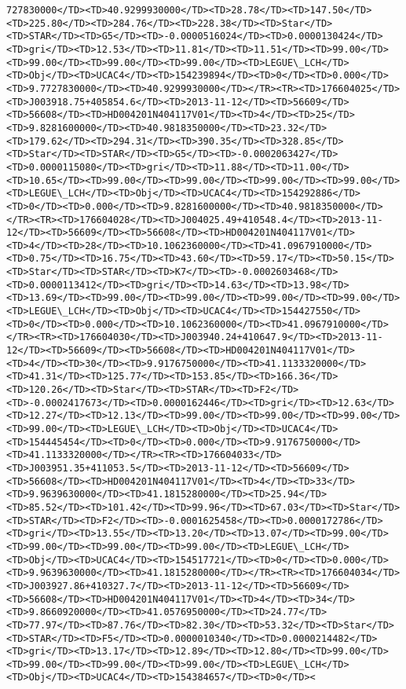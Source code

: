 \documentclass[11pt]{article}
\begin{document}
\begin{Verbatim}[commandchars=\\\{\}]
727830000</TD><TD>40.9299930000</TD><TD>28.78</TD><TD>147.50</TD><TD>225.80</TD><TD>284.76</TD><TD>228.38</TD><TD>Star</TD><TD>STAR</TD><TD>G5</TD><TD>-0.0000516024</TD><TD>0.0000130424</TD><TD>gri</TD><TD>12.53</TD><TD>11.81</TD><TD>11.51</TD><TD>99.00</TD><TD>99.00</TD><TD>99.00</TD><TD>99.00</TD><TD>LEGUE\_LCH</TD><TD>Obj</TD><TD>UCAC4</TD><TD>154239894</TD><TD>0</TD><TD>0.000</TD><TD>9.7727830000</TD><TD>40.9299930000</TD></TR><TR><TD>176604025</TD><TD>J003918.75+405854.6</TD><TD>2013-11-12</TD><TD>56609</TD><TD>56608</TD><TD>HD004201N404117V01</TD><TD>4</TD><TD>25</TD><TD>9.8281600000</TD><TD>40.9818350000</TD><TD>23.32</TD><TD>179.62</TD><TD>294.31</TD><TD>390.35</TD><TD>328.85</TD><TD>Star</TD><TD>STAR</TD><TD>G5</TD><TD>-0.0002063427</TD><TD>0.0000115080</TD><TD>gri</TD><TD>11.88</TD><TD>11.00</TD><TD>10.65</TD><TD>99.00</TD><TD>99.00</TD><TD>99.00</TD><TD>99.00</TD><TD>LEGUE\_LCH</TD><TD>Obj</TD><TD>UCAC4</TD><TD>154292886</TD><TD>0</TD><TD>0.000</TD><TD>9.8281600000</TD><TD>40.9818350000</TD></TR><TR><TD>176604028</TD><TD>J004025.49+410548.4</TD><TD>2013-11-12</TD><TD>56609</TD><TD>56608</TD><TD>HD004201N404117V01</TD><TD>4</TD><TD>28</TD><TD>10.1062360000</TD><TD>41.0967910000</TD><TD>0.75</TD><TD>16.75</TD><TD>43.60</TD><TD>59.17</TD><TD>50.15</TD><TD>Star</TD><TD>STAR</TD><TD>K7</TD><TD>-0.0002603468</TD><TD>0.0000113412</TD><TD>gri</TD><TD>14.63</TD><TD>13.98</TD><TD>13.69</TD><TD>99.00</TD><TD>99.00</TD><TD>99.00</TD><TD>99.00</TD><TD>LEGUE\_LCH</TD><TD>Obj</TD><TD>UCAC4</TD><TD>154427550</TD><TD>0</TD><TD>0.000</TD><TD>10.1062360000</TD><TD>41.0967910000</TD></TR><TR><TD>176604030</TD><TD>J003940.24+410647.9</TD><TD>2013-11-12</TD><TD>56609</TD><TD>56608</TD><TD>HD004201N404117V01</TD><TD>4</TD><TD>30</TD><TD>9.9176750000</TD><TD>41.1133320000</TD><TD>41.31</TD><TD>125.77</TD><TD>153.85</TD><TD>166.36</TD><TD>120.26</TD><TD>Star</TD><TD>STAR</TD><TD>F2</TD><TD>-0.0002417673</TD><TD>0.0000162446</TD><TD>gri</TD><TD>12.63</TD><TD>12.27</TD><TD>12.13</TD><TD>99.00</TD><TD>99.00</TD><TD>99.00</TD><TD>99.00</TD><TD>LEGUE\_LCH</TD><TD>Obj</TD><TD>UCAC4</TD><TD>154445454</TD><TD>0</TD><TD>0.000</TD><TD>9.9176750000</TD><TD>41.1133320000</TD></TR><TR><TD>176604033</TD><TD>J003951.35+411053.5</TD><TD>2013-11-12</TD><TD>56609</TD><TD>56608</TD><TD>HD004201N404117V01</TD><TD>4</TD><TD>33</TD><TD>9.9639630000</TD><TD>41.1815280000</TD><TD>25.94</TD><TD>85.52</TD><TD>101.42</TD><TD>99.96</TD><TD>67.03</TD><TD>Star</TD><TD>STAR</TD><TD>F2</TD><TD>-0.0001625458</TD><TD>0.0000172786</TD><TD>gri</TD><TD>13.55</TD><TD>13.20</TD><TD>13.07</TD><TD>99.00</TD><TD>99.00</TD><TD>99.00</TD><TD>99.00</TD><TD>LEGUE\_LCH</TD><TD>Obj</TD><TD>UCAC4</TD><TD>154517721</TD><TD>0</TD><TD>0.000</TD><TD>9.9639630000</TD><TD>41.1815280000</TD></TR><TR><TD>176604034</TD><TD>J003927.86+410327.7</TD><TD>2013-11-12</TD><TD>56609</TD><TD>56608</TD><TD>HD004201N404117V01</TD><TD>4</TD><TD>34</TD><TD>9.8660920000</TD><TD>41.0576950000</TD><TD>24.77</TD><TD>77.97</TD><TD>87.76</TD><TD>82.30</TD><TD>53.32</TD><TD>Star</TD><TD>STAR</TD><TD>F5</TD><TD>0.0000010340</TD><TD>0.0000214482</TD><TD>gri</TD><TD>13.17</TD><TD>12.89</TD><TD>12.80</TD><TD>99.00</TD><TD>99.00</TD><TD>99.00</TD><TD>99.00</TD><TD>LEGUE\_LCH</TD><TD>Obj</TD><TD>UCAC4</TD><TD>154384657</TD><TD>0</TD><
\end{Verbatim}
\end{document}
